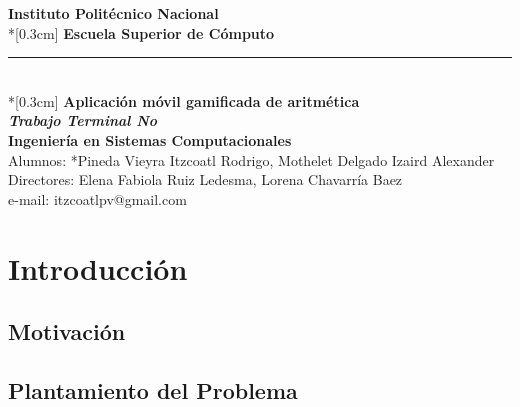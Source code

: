 \documentclass{article}
\begin{document}
\begin{titlepage}


        \begin{center}
            \LARGE \textbf{Instituto Politécnico Nacional}\\*[0.3cm]
            \Large \textbf{Escuela Superior de Cómputo}\\
            \vspace{1cm}
            \rule{12cm}{0.5mm}\\*[0.3cm]%
            \hspace{0.9cm} 
    		\LARGE \textbf{ Aplicación móvil gamificada de aritmética\\}
    		\LARGE \textbf {\emph{Trabajo Terminal No }} 
    		\vspace{1cm} %
    	\LARGE \textbf{\\ Ingeniería en Sistemas Computacionales\\}
    	Alumnos: *Pineda Vieyra Itzcoatl Rodrigo, Mothelet Delgado Izaird Alexander\\
	Directores: Elena Fabiola Ruiz Ledesma, Lorena Chavarría Baez\\
	e-mail: itzcoatlpv@gmail.com
    \vspace{1cm} %
        \end{center}

    \centering %
    \vspace{1cm} %

   	


\end{titlepage}

\tableofcontents

\section{Introducción}

\subsection{Motivación}
\subsection{Plantamiento del Problema}
\end{document}
